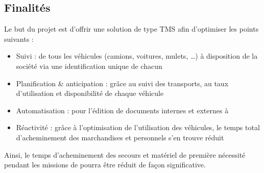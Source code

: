 \subsection{Finalités}
Le but du projet est d'offrir une solution de type TMS afin d'optimiser les points suivants :
\begin{itemize}
\item Suivi : de tous les véhicules (camions, voitures, mulets, …) à disposition de la société via une identification unique de chacun
\item Planification \& anticipation : grâce au suivi des transports, au taux d'utilisation et disponibilité de chaque véhicule
\item Automatisation : pour l'édition de documents internes et externes à \mo
\item Réactivité : grâce à l'optimisation de l'utilisation des véhicules, le temps total d'acheminement des marchandises et personnels s'en trouve réduit
\end{itemize}
Ainsi, le temps d'acheminement des secours et matériel de première nécessité pendant les missions de \mo pourra être réduit de façon significative.

